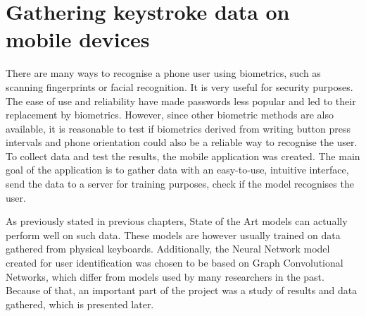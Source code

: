 
\chapter{Gathering keystroke data on mobile devices}

There are many ways to recognise a phone user using biometrics, such as scanning fingerprints or facial recognition. It is very useful for security purposes. The ease of use and reliability have made passwords less popular and led to their replacement by biometrics. However, since other biometric methods are also available, it is reasonable to test if biometrics derived from writing button press intervals and phone orientation could also be a reliable way to recognise the user. To collect data and test the results, the mobile application was created.
The main goal of the application is to gather data with an easy-to-use, intuitive interface, send the data to a server for training purposes, check if the model recognises the user. 

As previously stated in previous chapters, State of the Art models can actually perform well on such data. \cite{Lu2020} These models are however usually trained on data gathered from physical keyboards. Additionally, the Neural Network model created for user identification was chosen to be based on Graph Convolutional Networks, which differ from models used by many researchers in the past.
Because of that, an important part of the project was a study of results and data gathered, which is presented later.


